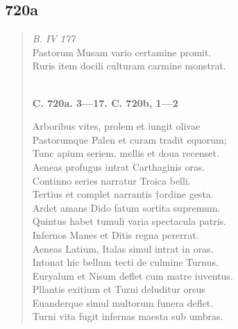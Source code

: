 \documentclass[11pt, a4paper]{report}
\begin{document}
            \subsection*{720a}
      \begin{verse}
      \textit{B. IV 177} \\ Pastorum Musam vario certamine promit. \\ Ruris item docili culturam carmine monstrat. \\ 
        ﻿\pagebreak 
     \marginpar{[205]} \begin{center} \textbf{C. 720a. 3—17. C. 720b, 1—2} \end{center}Arboribus vites, prolem et iungit olivae \\ Pastorumque Palen et curam tradit equorum; \\ Tunc apium seriem, mellis et doua recenset. \\ Aeneas profugus intrat Carthaginis oras. \\ Continno series narratur Troica belli. \\ Tertius et complet narrantis †ordine gesta. \\ Ardet amans Dido fatum sortita supremum. \\ Quintus habet tumuli varia spectacula patris. \\ Infernos Manes et Ditis regna pererrat. \\ Aeneas Latium, Italas simul intrat in oras. \\ Intonat hic bellum tecti de culmine Turnus. \\ Euryalum et Nisum deflet cum matre iuventus. \\ Pllantis exitium et Turni deluditur orsus \\ Euanderque simul multorum funera deflet. \\ Turni vita fugit infernas maesta sub umbras. \\ 
      \end{verse}
  
\end{document}
